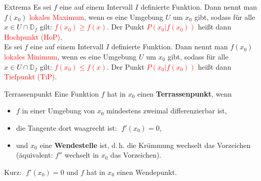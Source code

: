  \begin{defi}{Extrema}{}
   Es sei $f$ eine auf einem Intervall $I$ definierte Funktion. Dann nennt man $f(x_0)$ \textcolor{red}{lokales Maximum}, wenn es eine Umgebung $U$ um $x_0$ gibt, sodass für alle  $x \in U \cap \mathds{D}_f$ gilt: \textcolor{red}{$f(x_0)\geq f(x)$}. Der Punkt \textcolor{red}{$P(x_0|f(x_0))$} heißt dann \textcolor{red}{Hochpunkt (HoP)}.\\
   Es sei $f$ eine auf einem Intervall $I$ definierte Funktion. Dann nennt man $f(x_0)$ \textcolor{red}{lokales Minimum}, wenn es eine Umgebung $U$ um $x_0$ gibt, sodass für alle  $x \in U \cap \mathds{D}_f$ gilt: \textcolor{red}{$f(x_0)\leq f(x)$}. Der Punkt \textcolor{red}{$P(x_0|f(x_0))$} heißt dann \textcolor{red}{Tiefpunkt (TiP)}.
 \end{defi}
 \begin{defi}{Terrassenpunkt}{}
     Eine Funktion \(f\) hat in \(x_0\) einen \textbf{Terrassenpunkt}, wenn
\begin{itemize}
\item \(f\) in einer Umgebung von \(x_0\) mindestens zweimal differenzierbar ist,
\item die Tangente dort waagrecht ist: \(\;f'(x_0)=0\),
\item und \(x_0\) eine \textbf{Wendestelle} ist, d.\,h. die Krümmung wechselt das Vorzeichen
      (äquivalent: \(f''\) wechselt in \(x_0\) das Vorzeichen).
\end{itemize}
Kurz: \(\;f'(x_0)=0\) und \(f\) hat in \(x_0\) einen Wendepunkt.
 \end{defi}

